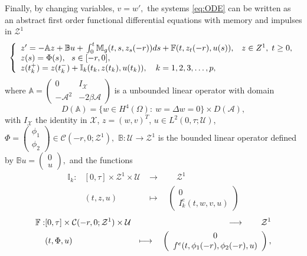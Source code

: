 \documentclass[11 pt]{amsart}
\begin{document}
\noindent Finally, by changing variables, $v=w',$  the systems \eqref{eq:ODE} can be written as an abstract first order
functional differential equations with memory and impulses in ${\mathcal{Z}}^{1}$
\begin{equation}\label{eq:abstract}
\left\{
\begin{array}{ll}
z' =  -{\mathbb{A}} z+ {\mathbb{B}} u + {\displaystyle} \int_{0}^{t}{\mathbb{M}_g}(t,s ,z_{s}(-r))ds + {\mathbb{F}}(t,z_{t}(-r),u(s)) ,& z\in Z^{1},\; t\geq 0, \\
z(s)  = \Phi(s), \ \ s \in [-r,0],\\
z(t_{k}^{+})  = z(t_{k}^{-})+{\mathbb{I}}_{k}(t_k, z(t_{k}),u(t_{k})), \quad  k=1,2,3, \dots, p,
\end{array}
\right.
\end{equation}
where ${\mathbb{A}} = \left(
   \begin{array}{rr}
     0 & I_{\mathcal{X}} \\ - {\mathcal{A}}^2 & -2\beta {\mathcal{A}}
   \end{array}\right)$ is a unbounded linear operator  with domain
$$
D({\mathbb{A}})=\{w\in H^{4}(\Omega):\:w=\Delta w=0\}\times D({\mathcal{A}}),
$$ with  $I_{\mathcal{X}}$ the identity in ${\mathcal{X}} $,
$ z =(w,v)^{T}$,
$u\in L^{2}(0,\tau;{\mathcal{U}})$,
   $\Phi=\left(\begin{array}{c}
             \phi_1\\
             \phi_2
        \end{array}\right) \in {\mathcal{C}}\left(-r,0;  {\mathcal{Z}}^{1} \right),$   ${\mathbb{B}}: {\mathcal{U}} \longrightarrow {\mathcal{Z}}^{1}$ is the bounded linear operator defined by
${\mathbb{B}} u=
\left(\begin{array}{c}
             0\\
             u
        \end{array}\right),$ and the functions
\begin{eqnarray*}
{\mathbb{I}}_{k}:&[0, \tau]\times {\mathcal{Z}}^{1} \times {\mathcal{U}}& \longrightarrow \qquad {\mathcal{Z}}^{1} \\
&(t, z,u)&\longmapsto \quad
\left(\begin{array}{c}
             0\\
             I_{k}^{e}(t,w,v,u)
        \end{array}\right)
        \end{eqnarray*}
\begin{eqnarray}
\label{functionF}
{\mathbb{F}}:& [0, \tau] \times {\mathcal{C}}(-r,0;  {\mathcal{Z}}^{1} ) \times {\mathcal{U}} & \longrightarrow \qquad {\mathcal{Z}}^{1}\\
&(t, \Phi,u)&\longmapsto \quad
\left(
  \begin{array}{c}
    0 \\f^{e}(t,\phi_1(-r),\phi_2(-r),u)
  \end{array}
  \right),\notag
  \end{eqnarray}
\end{document}
